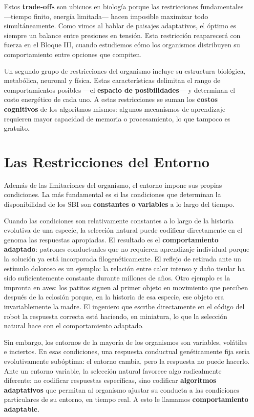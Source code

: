 \documentclass[
  letterpaper,
  DIV=11,
  numbers=noendperiod]{scrreprt}
\begin{document}
Estos \textbf{trade-offs} son ubicuos en biología porque las
restricciones fundamentales ---tiempo finito, energía limitada--- hacen
imposible maximizar todo simultáneamente. Como vimos al hablar de
paisajes adaptativos, el óptimo es siempre un balance entre presiones en
tensión. Esta restricción reaparecerá con fuerza en el Bloque III,
cuando estudiemos cómo los organismos distribuyen su comportamiento
entre opciones que compiten.

Un segundo grupo de restricciones del organismo incluye su estructura
biológica, metabólica, neuronal y física. Estas características
delimitan el rango de comportamientos posibles ---el \textbf{espacio de
posibilidades}--- y determinan el costo energético de cada uno. A estas
restricciones se suman los \textbf{costos cognitivos} de los algoritmos
mismos: algunos mecanismos de aprendizaje requieren mayor capacidad de
memoria o procesamiento, lo que tampoco es gratuito.

\section{Las Restricciones del
Entorno}\label{las-restricciones-del-entorno}

Además de las limitaciones del organismo, el entorno impone sus propias
condiciones. La más fundamental es si las condiciones que determinan la
disponibilidad de los SBI son \textbf{constantes o variables} a lo largo
del tiempo.

Cuando las condiciones son relativamente constantes a lo largo de la
historia evolutiva de una especie, la selección natural puede codificar
directamente en el genoma las respuestas apropiadas. El resultado es el
\textbf{comportamiento adaptado}: patrones conductuales que no requieren
aprendizaje individual porque la solución ya está incorporada
filogenéticamente. El reflejo de retirada ante un estímulo doloroso es
un ejemplo: la relación entre calor intenso y daño tisular ha sido
suficientemente constante durante millones de años. Otro ejemplo es la
impronta en aves: los patitos siguen al primer objeto en movimiento que
perciben después de la eclosión porque, en la historia de esa especie,
ese objeto era invariablemente la madre. El ingeniero que escribe
directamente en el código del robot la respuesta correcta está haciendo,
en miniatura, lo que la selección natural hace con el comportamiento
adaptado.

Sin embargo, los entornos de la mayoría de los organismos son variables,
volátiles e inciertos. En esas condiciones, una respuesta conductual
genéticamente fija sería evolutivamente subóptima: el entorno cambia,
pero la respuesta no puede hacerlo. Ante un entorno variable, la
selección natural favorece algo radicalmente diferente: no codificar
respuestas específicas, sino codificar \textbf{algoritmos adaptativos}
que permitan al organismo ajustar su conducta a las condiciones
particulares de su entorno, en tiempo real. A esto le llamamos
\textbf{comportamiento adaptable}.
\end{document}

